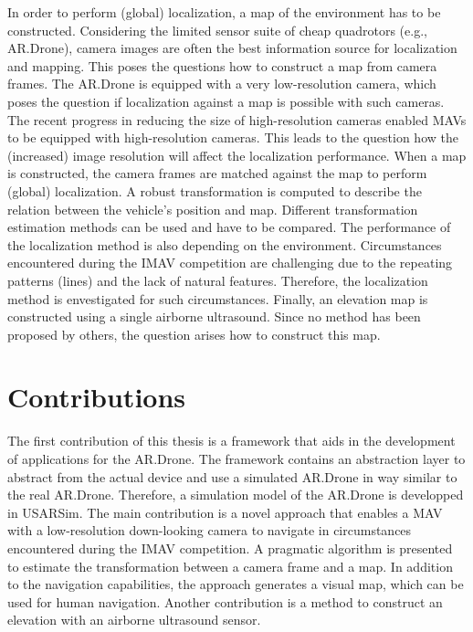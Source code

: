 In order to perform (global) localization, a map of the environment has to be constructed.
Considering the limited sensor suite of cheap quadrotors (e.g., AR.Drone), camera images are often the best information source for localization and mapping.
This poses the questions how to construct a map from camera frames.
The AR.Drone is equipped with a very low-resolution camera, which poses the question if localization against a map is possible with such cameras.
The recent progress in reducing the size of high-resolution cameras enabled MAVs to be equipped with high-resolution cameras.
This leads to the question how the (increased) image resolution will affect the localization performance.
When a map is constructed, the camera frames are matched against the map to perform (global) localization.
A robust transformation is computed to describe the relation between the vehicle's position and map.
Different transformation estimation methods can be used and have to be compared.
The performance of the localization method is also depending on the environment.
Circumstances encountered during the IMAV competition are challenging due to the repeating patterns (lines) and the lack of natural features.
Therefore, the localization method is envestigated for such circumstances.
Finally, an elevation map is constructed using a single airborne ultrasound.
Since no method has been proposed by others, the question arises how to construct this map.





\section{Contributions}
The first contribution of this thesis is a framework that aids in the development of applications for the AR.Drone.
The framework contains an abstraction layer to abstract from the actual device and use a simulated AR.Drone in way similar to the real AR.Drone.
Therefore, a simulation model of the AR.Drone is developped in USARSim.
The main contribution is a novel approach that enables a MAV with a low-resolution down-looking camera to navigate in circumstances encountered during the IMAV competition.
A pragmatic algorithm is presented to estimate the transformation between a camera frame and a map.
In addition to the navigation capabilities, the approach generates a visual map, which can be used for human navigation.
Another contribution is a method to construct an elevation with an airborne ultrasound sensor.

